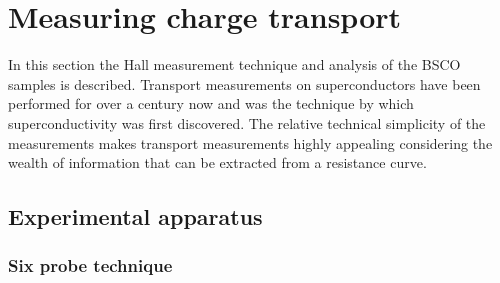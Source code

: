 
\section{Measuring charge transport}

In this section the Hall measurement technique and analysis of the \ac{BSCO} samples is described. Transport measurements on superconductors have been performed for over a century now and was the technique by which superconductivity was first discovered. The relative technical simplicity of the measurements makes transport measurements highly appealing considering the wealth of information that can be extracted from a resistance curve.


\subsection{Experimental apparatus}

\subsubsection{Six probe technique}
\label{Sec:Exp:SixProbe}


